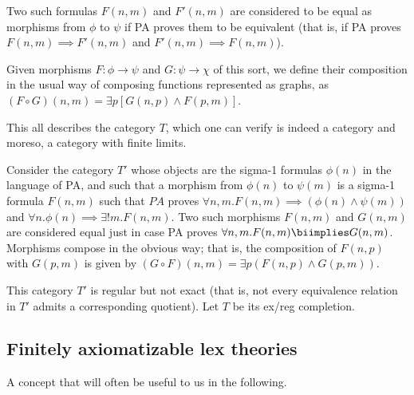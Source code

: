 \begin{construction}
Two such formulas $F(n, m)$ and $F'(n, m)$ are considered to be equal as morphisms from $\phi$ to $\psi$ if PA proves them to be equivalent (that is, if PA proves $F(n, m) \implies F'(n, m)$ and $F'(n, m) \implies F(n, m)$).

Given morphisms $F : \phi \to \psi$ and $G: \psi \to \chi$ of this sort, we define their composition in the usual way of composing functions represented as graphs, as $(F \circ G)(n, m) = \exists p [G(n, p) \wedge F(p, m)]$.

This all describes the category $T$, which one can verify is indeed a category and moreso, a category with finite limits.


Consider the category $T'$ whose objects are the sigma-1 formulas $\phi(n)$ in the language of PA, and such that a morphism from $\phi(n)$ to $\psi(m)$ is a sigma-1 formula $F(n, m)$ such that $PA$ proves $\forall n, m . F(n, m) \implies (\phi(n) \wedge \psi(m))$ and $\forall n . \phi(n) \implies \exists! m . F(n, m)$. Two such morphisms $F(n, m)$ and $G(n, m)$ are considered equal just in case PA proves $\forall n, m . F(n, m) \biimplies G(n, m)$. Morphisms compose in the obvious way; that is, the composition of $F(n, p)$ with $G(p, m)$ is given by $(G \circ F)(n, m) = \exists p (F(n, p) \wedge G(p, m))$.

This category $T'$ is regular but not exact (that is, not every equivalence relation in $T'$ admits a corresponding quotient). Let $T$ be its ex/reg completion.

\end{construction}


\subsection{Finitely axiomatizable lex theories}
A concept that will often be useful to us in the following.


